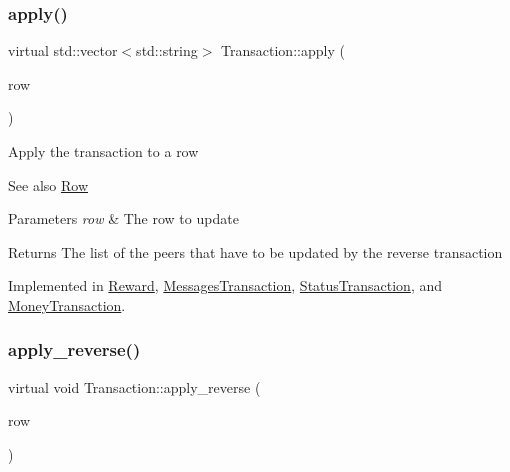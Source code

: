 \subsubsection{\texorpdfstring{apply()}{apply()}}
{\footnotesize\ttfamily virtual std\+::vector$<$std\+::string$>$ Transaction\+::apply (\begin{DoxyParamCaption}\item[{\mbox{\hyperlink{classRow}{Row}} $\ast$}]{row }\end{DoxyParamCaption})\hspace{0.3cm}{\ttfamily [pure virtual]}}

Apply the transaction to a row \begin{DoxySeeAlso}{See also}
\mbox{\hyperlink{classRow}{Row}}
\end{DoxySeeAlso}

\begin{DoxyParams}{Parameters}
{\em row} & The row to update \\
\hline
\end{DoxyParams}
\begin{DoxyReturn}{Returns}
The list of the peers that have to be updated by the reverse transaction 
\end{DoxyReturn}


Implemented in \mbox{\hyperlink{classReward_aae55ec2aa2aa31cc365c80cb42be9ab5}{Reward}}, \mbox{\hyperlink{classMessagesTransaction_af39b2220f345169fa3276597f38681d5}{Messages\+Transaction}}, \mbox{\hyperlink{classStatusTransaction_a77d1d73cf3faa9d9e10753420536377a}{Status\+Transaction}}, and \mbox{\hyperlink{classMoneyTransaction_a8aa6f693c524d8e1e052b616546f9647}{Money\+Transaction}}.

\mbox{\label{classTransaction_a1ef3b245f37c217f50f8f76fceebca4a}} 
\subsubsection{\texorpdfstring{apply\+\_\+reverse()}{apply\_reverse()}}
{\footnotesize\ttfamily virtual void Transaction\+::apply\+\_\+reverse (\begin{DoxyParamCaption}\item[{\mbox{\hyperlink{classRow}{Row}} $\ast$}]{row }\end{DoxyParamCaption})\hspace{0.3cm}{\ttfamily [pure virtual]}}

